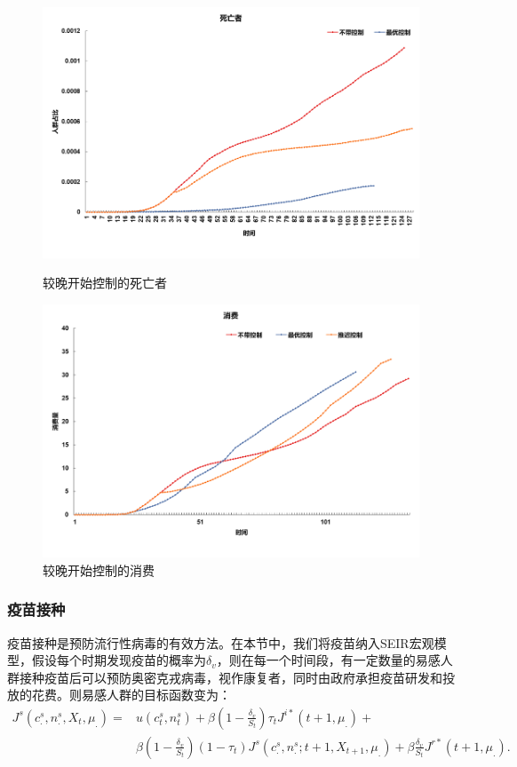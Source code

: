 \begin{figure}[htbp]
    \begin{minipage}{0.49\linewidth}
		\centering
		\includegraphics[width=0.9\linewidth]{fig/image044.png}
		\caption{较晚开始控制的死亡者}
		\label{fig:ima21}%
	\end{minipage}
	\begin{minipage}{0.49\linewidth}
		\centering
		\includegraphics[width=0.9\linewidth]{fig/image034.png}
		\caption{较晚开始控制的消费}
		\label{fig:ima22}%
	\end{minipage}
\end{figure}

\subsubsection{疫苗接种}
疫苗接种是预防流行性病毒的有效方法。在本节中，我们将疫苗纳入SEIR宏观模型，假设每个时期发现疫苗的概率为$\delta_v$，则在每一个时间段，有一定数量的易感人群接种疫苗后可以预防奥密克戎病毒，视作康复者，同时由政府承担疫苗研发和投放的花费。则易感人群的目标函数变为：
\begin{align*}
    J^s(c_{.}^{s},n_{.}^{s},X_t,\mu_.)=&u(c_t^s,n_t^s)+\beta (1-\frac{\delta_v}{S_t}) \tau_t J^{i*}(t+1,\mu_.)+ \\
	&\beta (1-\frac{\delta_v}{S_t}) (1-\tau_t)J^s(c_.^s,n_.^s;t+1,X_{t+1},\mu_.) + \beta \frac{\delta_v}{S_t}J^{r*}(t+1,\mu_.).
\end{align*}

